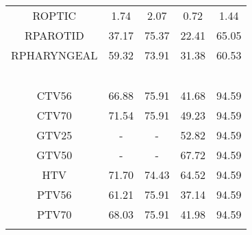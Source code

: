 \begin{sidewaystable}[p]
{\begin{tabular}{ccccc}
ROPTIC & 1.74 & 2.07 & 0.72 & 1.44 \\
RPAROTID & 37.17 & 75.37 & 22.41 & 65.05 \\
RPHARYNGEAL & 59.32 & 73.91 & 31.38 & 60.53 \\\\\\\\\\
\midrule\\       
CTV56 & 66.88 & 75.91 & 41.68 & 94.59 \\
CTV70 & 71.54 & 75.91 & 49.23 & 94.59 \\
GTV25 & - & - & 52.82 & 94.59 \\
GTV50 & - & - & 67.72 & 94.59 \\
HTV & 71.70 & 74.43 & 64.52 & 94.59 \\
PTV56 & 61.21 & 75.91 & 37.14 & 94.59 \\
PTV70 & 68.03 & 75.91 & 41.98 & 94.59 \\
 \bottomrule\\
 \end{tabular}
}
\end{sidewaystable}


